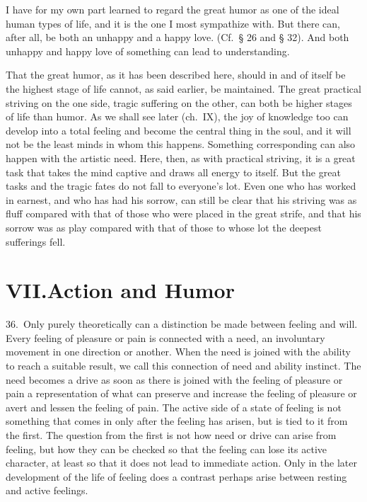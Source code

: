 \documentclass[12pt]{book}
\newcommand{\opage}[1]{\marginnote{\footnotesize\textit{[#1]}}}
\begin{document}
I have for my own part learned to regard the great humor as one of the ideal human types of
life, and it is the one I most sympathize with. But there can, after all, be both an unhappy
and a happy love. (Cf.\ § 26 and § 32). And both unhappy and happy love of something can
lead to understanding.

That the great humor, as it has been described here, should in and of itself be the highest
stage of life cannot, as said earlier, be maintained. The great practical striving on the
one side, tragic suffering on the other, can both be higher stages of life than humor. As
we shall see later (ch.~IX), the joy of knowledge too can develop into a total feeling and
become the central thing in the soul, and it will not be the least minds in whom this
happens. Something corresponding can also happen with the artistic need. Here, then, as with
practical striving, it is a great task that takes the mind captive and draws all energy to
\opage{123}itself. But the great tasks and the tragic fates do not fall to everyone's lot.
Even one who has worked in earnest, and who has had his sorrow, can still be clear that his
striving was as fluff compared with that of those who were placed in the great strife, and
that his sorrow was as play compared with that of those to whose lot the deepest sufferings
fell.

\chapter*{VII.\quad Action and Humor}
\opage{124}36.~Only purely theoretically can a distinction be made between feeling and
will. Every feeling of pleasure or pain is connected with a need, an involuntary movement in
one direction or another. When the need is joined with the ability to reach a suitable
result, we call this connection of need and ability instinct. The need becomes a drive as
soon as there is joined with the feeling of pleasure or pain a representation of what can
preserve and increase the feeling of pleasure or avert and lessen the feeling of pain. The
active side of a state of feeling is not something that comes in only after the feeling has
arisen, but is tied to it from the first. The question from the first is not how need or
drive can arise from feeling, but how they can be checked so that the feeling can lose its
active character, at least so that it does not lead to immediate action. Only in the later
development of the life of feeling does a contrast perhaps arise between resting and active
feelings.
\end{document}
